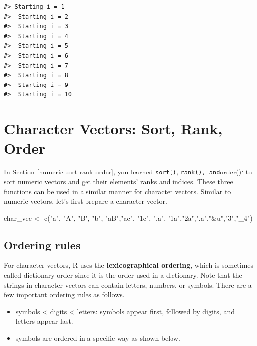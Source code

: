 \documentclass[
]{book}
\newenvironment{Shaded}{\begin{snugshade}}{\end{snugshade}}
\newcommand{\FunctionTok}[1]{\textcolor[rgb]{0.00,0.00,0.00}{#1}}
\newcommand{\NormalTok}[1]{#1}
\newcommand{\OtherTok}[1]{\textcolor[rgb]{0.56,0.35,0.01}{#1}}
\newcommand{\StringTok}[1]{\textcolor[rgb]{0.31,0.60,0.02}{#1}}
\begin{document}
\begin{verbatim}
#> Starting i = 1
#>  Starting i = 2
#>  Starting i = 3
#>  Starting i = 4
#>  Starting i = 5
#>  Starting i = 6
#>  Starting i = 7
#>  Starting i = 8
#>  Starting i = 9
#>  Starting i = 10
\end{verbatim}

\hypertarget{character-sort-rank-order}{%
\section{Character Vectors: Sort, Rank, Order}\label{character-sort-rank-order}}

In Section \ref{numeric-sort-rank-order}, you learned \texttt{sort()}, \texttt{rank()\textasciigrave{}\textasciigrave{},\ and}order()` to sort numeric vectors and get their elements' ranks and indices. These three functions can be used in a similar manner for character vectors. Similar to numeric vectors, let's first prepare a character vector.

\begin{Shaded}
\begin{Highlighting}[]
\NormalTok{char\_vec }\OtherTok{\textless{}{-}} \FunctionTok{c}\NormalTok{(}\StringTok{"a"}\NormalTok{, }\StringTok{"A"}\NormalTok{, }\StringTok{"B"}\NormalTok{, }\StringTok{"b"}\NormalTok{, }\StringTok{"aB"}\NormalTok{,}\StringTok{"ac"}\NormalTok{, }\StringTok{"1c"}\NormalTok{, }\StringTok{".a"}\NormalTok{, }\StringTok{"1a"}\NormalTok{,}\StringTok{"2a"}\NormalTok{,}\StringTok{".a"}\NormalTok{,}\StringTok{"\&u"}\NormalTok{,}\StringTok{"3"}\NormalTok{,}\StringTok{"\_4"}\NormalTok{)}
\end{Highlighting}
\end{Shaded}

\hypertarget{ordering-rules}{%
\subsection{Ordering rules}\label{ordering-rules}}

For character vectors, R uses the \textbf{lexicographical ordering}, which is sometimes called dictionary order since it is the order used in a dictionary. Note that the strings in character vectors can contain letters, numbers, or symbols. There are a few important ordering rules as follows.

\begin{itemize}
\item
  symbols \textless{} digits \textless{} letters: symbols appear first, followed by digits, and letters appear last.
\item
  symbols are ordered in a specific way as shown below.
\end{itemize}
\end{document}
